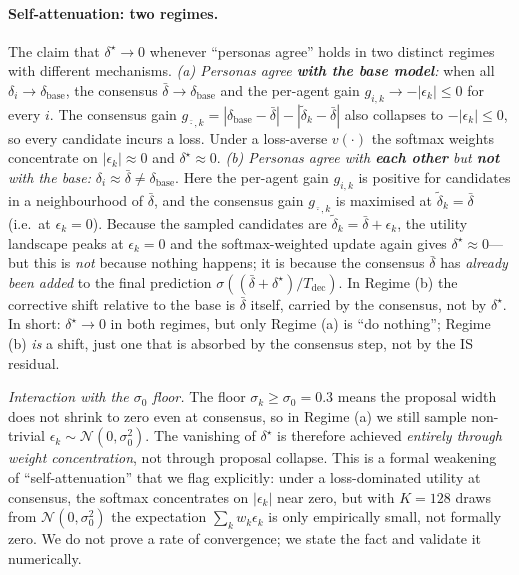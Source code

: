 \documentclass{article}
\begin{document}
\paragraph{Self-attenuation: two regimes.}
The claim that $\delta^{\star}\to 0$ whenever ``personas agree'' holds
in two distinct regimes with different mechanisms.
\emph{(a) Personas agree \textbf{with the base model}:} when all
$\delta_i\to\delta_{\text{base}}$, the consensus
$\bar{\delta}\to\delta_{\text{base}}$ and the per-agent gain
$g_{i,k}\to-|\epsilon_k|\le 0$ for every $i$. The consensus gain
$g_{\bar{\cdot},k}=|\delta_{\text{base}}-\bar{\delta}|-|\tilde{\delta}_k-\bar{\delta}|$
also collapses to $-|\epsilon_k|\le 0$, so every candidate incurs a loss.
Under a loss-averse $v(\cdot)$ the softmax weights concentrate on
$|\epsilon_k|\approx 0$ and $\delta^{\star}\approx 0$.
\emph{(b) Personas agree with \textbf{each other} but \textbf{not} with the
base:} $\delta_i\approx\bar{\delta}\neq\delta_{\text{base}}$. Here the per-agent
gain $g_{i,k}$ is positive for candidates in a neighbourhood of
$\bar{\delta}$, and the consensus gain $g_{\bar{\cdot},k}$ is maximised at
$\tilde{\delta}_k=\bar{\delta}$ (i.e.\ at $\epsilon_k=0$). Because the sampled
candidates are $\tilde{\delta}_k=\bar{\delta}+\epsilon_k$, the utility landscape
peaks at $\epsilon_k=0$ and the softmax-weighted update again gives
$\delta^{\star}\approx 0$---but this is \emph{not} because nothing happens;
it is because the consensus $\bar{\delta}$ has \emph{already been added} to
the final prediction $\sigma((\bar{\delta}+\delta^{\star})/T_{\text{dec}})$.
In Regime (b) the corrective shift relative to the base is $\bar{\delta}$
itself, carried by the consensus, not by $\delta^{\star}$.
In short: $\delta^{\star}\to 0$ in both regimes, but only Regime (a) is
``do nothing''; Regime (b) \emph{is} a shift, just one that is absorbed by
the consensus step, not by the IS residual.

\emph{Interaction with the $\sigma_0$ floor.} The floor
$\sigma_k\ge\sigma_0=0.3$ means the proposal width does not shrink to zero
even at consensus, so in Regime (a) we still sample non-trivial
$\epsilon_k\sim\mathcal{N}(0,\sigma_0^2)$. The vanishing of $\delta^{\star}$
is therefore achieved \emph{entirely through weight concentration}, not
through proposal collapse. This is a formal weakening of ``self-attenuation''
that we flag explicitly: under a loss-dominated utility at consensus, the
softmax concentrates on $|\epsilon_k|$ near zero, but with $K=128$ draws from
$\mathcal{N}(0,\sigma_0^2)$ the expectation $\sum_k w_k\epsilon_k$ is only
empirically small, not formally zero. We do not prove a rate of convergence;
we state the fact and validate it numerically.
\end{document}
